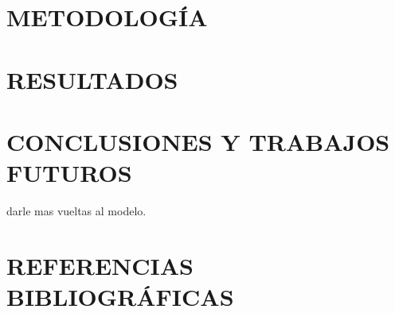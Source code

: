 \documentclass[12pt,a4paper]{article}
\begin{document}
\section{METODOLOGÍA}
             

\section{RESULTADOS}
	

\section{CONCLUSIONES Y TRABAJOS FUTUROS}
	 darle mas vueltas al modelo.
\section{REFERENCIAS BIBLIOGRÁFICAS}

\printbibliography


\newpage

%
\end{document}
